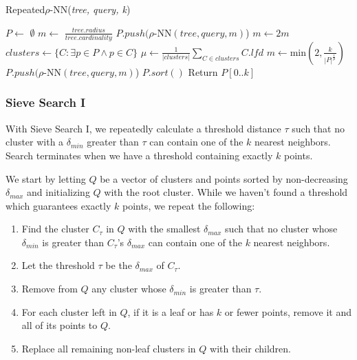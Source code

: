 \begin{algorithm} %
    \caption{Repeated$\rho$-NN(\emph{tree, query, k})} %
    \label{alg:knn-by-rnn} %
    \begin{algorithmic}[4] %
        \STATE $P \leftarrow$ $\emptyset$
        \STATE $m \leftarrow$ $\frac{tree.radius}{tree.cardinality}$
            \STATE $P.push(\rho$-NN$(tree, query, m)$)
            \STATE $m \leftarrow 2m$
        \ENDWHILE
            \STATE $clusters \leftarrow \{ C: \exists p \in P \land p \in C \}$
            \STATE $\mu \leftarrow \frac{1}{|clusters|} \sum_{C \in clusters} C.lfd$
            \STATE $m \leftarrow \text{min}\left(2, \frac{k}{|P|^{\frac{1}{\mu}}}\right)$
            \STATE $P.push(\rho$-NN$(tree, query, m)$)
        \ENDWHILE
        \STATE $P.sort()$
        \STATE Return $P[0..k]$
    \end{algorithmic}
    \end{algorithm}

\subsubsection{Sieve Search I}
\label{subsubsec:methods:knn-search:sieve}
With Sieve Search I, we repeatedly calculate a threshold distance $\tau$ such that no cluster with a $\delta_{min}$ greater than $\tau$ 
can contain one of the $k$ nearest neighbors. Search terminates when we have a threshold containing exactly $k$ points.

We start by letting $Q$ be a vector of clusters and points sorted by non-decreasing $\delta_{max}$ and initializing $Q$ with the root cluster. 
While we haven't found a threshold which guarantees exactly $k$ points, we repeat the following: 

\begin{enumerate}
\item Find the cluster $C_{\tau}$ in $Q$ with the smallest $\delta_{max}$ such that no cluster whose $\delta_{min}$ is greater than $C_{\tau}$'s $\delta_{max}$ can contain one of the $k$ nearest neighbors.
\item Let the threshold $\tau$ be the $\delta_{max}$ of $C_{\tau}$.
\item Remove from $Q$ any cluster whose $\delta_{min}$ is greater than $\tau$.
\item For each cluster left in $Q$, if it is a leaf or has $k$ or fewer points, remove it and all of its points to $Q$.
\item Replace all remaining non-leaf clusters in $Q$ with their children. 
\end{enumerate}

